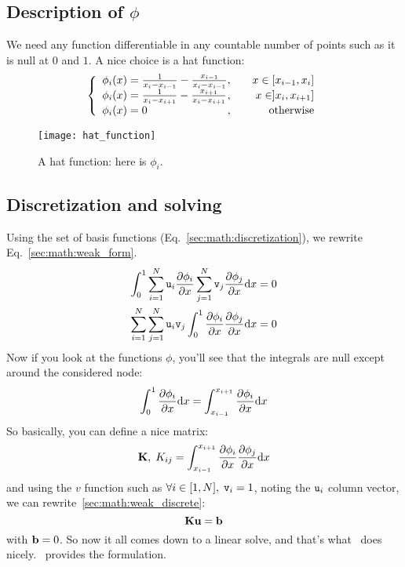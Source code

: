 \subsection{Description of \texorpdfstring{$\phi$}{the basis functions}}

We need any function differentiable in any countable number of points such as
it is null at $0$ and $1$. A nice
choice is a hat function:
\begin{equation}
\left\{\begin{array}{l@{,\qquad}r}
\phi_i(x) = \frac{1}{x_i - x_{i-1}} - \frac{x_{i-1}}{x_i - x_{i-1}} & x \in [x_{i-1},x_i] \\
\phi_i(x) = \frac{1}{x_i - x_{i+1}} - \frac{x_{i+1}}{x_i - x_{i+1}} & x \in ]x_i,x_{i+1}] \\
\phi_i(x) = 0                                                       & \text{otherwise}
\end{array}\right.
\end{equation}
\begin{figure}
\centering
\texttt{[image: hat\_function]}
\caption{\label{sec:math:hat_function}A hat function: here is $\phi_i$.}
\end{figure}

\subsection{Discretization and solving}

Using the set of basis functions (Eq.~\ref{sec:math:discretization}), we rewrite 
Eq.~\ref{sec:math:weak_form}.
\begin{equation}
\begin{split}
\int_0^1\sum_{i=1}^N\mathtt{u}_i\frac{\partial\phi_i}{\partial x}\sum_{j=1}^N\mathtt{v}_j\frac{\partial\phi_j}{\partial x} \mathrm{d} x & = 0 \\
\sum_{i=1}^N\sum_{j=1}^N\mathtt{u}_i\mathtt{v}_j\int_0^1\frac{\partial\phi_i}{\partial x}\frac{\partial\phi_j}{\partial x} \mathrm{d} x & = 0 \\
\end{split}
\label{sec:math:weak_discrete}
\end{equation}
Now if you look at the functions $\phi$, you'll see that the integrals are null except
around the considered node:
\begin{equation}
\int_0^1\frac{\partial\phi_i}{\partial x} \mathrm{d} x = \int_{x_{i-1}}^{x_{i+1}}\frac{\partial\phi_i}{\partial x} \mathrm{d} x
\end{equation}
So basically, you can define a nice matrix:
\begin{equation}
\mathbf{K},\; K_{ij} = \int_{x_{i-1}}^{x_{i+1}}\frac{\partial\phi_i}{\partial x}\frac{\partial\phi_j}{\partial x} \mathrm{d} x
\end{equation}
and using the $v$ function such as $\forall i \in [1,N], \; \mathtt{v}_i = 1$, noting
 the $\mathtt{u}_i$ column vector, we can
rewrite~\ref{sec:math:weak_discrete}:
\begin{equation}
\mathbf{K} \mathbf{u} = \mathbf{b}
\end{equation}
with $\mathbf{b} = 0$. So now it all comes down to a linear solve, and that's what
\LibMesh\ does nicely. \GRINS\ provides the formulation.

